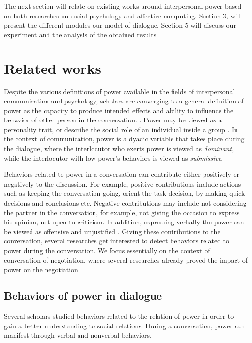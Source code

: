 \documentclass{llncs}
\begin{document}
	The next section will relate on existing works around interpersonal power based on both researches on social psychology and affective computing. Section 3, will present the different modules our model of dialogue. Section 5 will discuss our experiment and the analysis of the obtained results. 
	
	
	\section{Related works}
	\par Despite the various definitions of power available in the fields of interpersonal communication and psychology, scholars are converging to a general definition of power as the capacity to produce intended effects and ability to influence the behavior of other person in the conversation. \cite{dunbar2005perceptions}. Power may be viewed as a personality trait, or describe the social role of an individual inside a group \cite{kecskes2013research}. In the context of communication, power is a dyadic variable that takes place during the dialogue, where the interlocutor who exerts power is viewed as \textit{dominant}, while the interlocutor with low power's behaviors is viewed as \textit{submissive}. 
	\par Behaviors related to power in a conversation can contribute either positively or negatively to the discussion. For example, positive contributions include actions such as keeping the conversation going, orient the task decision, by making quick decisions and conclusions etc. Negative contributions may include not considering the partner in the conversation, for example, not giving the occasion to express his opinion, not open to criticism. In addition, expressing verbally the power can be viewed as offensive and unjustified \cite{zablotskaya2012relating}. Giving these contributions to the conversation, several researches get interested to detect behaviors related to power during the conversation. We focus essentially on the context of conversation of negotiation, where several researches already proved the impact of power on the negotiation\cite{van2006power}.
	
	\subsection{Behaviors of power in dialogue}
	\label{domDialogue}
	Several scholars studied behaviors related to the relation of power in order to gain a better understanding to social relations. During a conversation, power can manifest through verbal and nonverbal behaviors.
	
\end{document}
